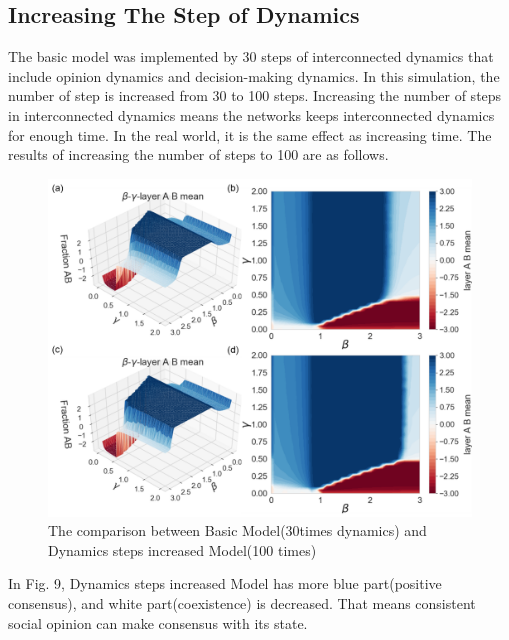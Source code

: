 \documentclass[english]{cccconf}
\begin{document}
\subsection{Increasing The Step of Dynamics}
The basic model was implemented by 30 steps of interconnected dynamics that include opinion dynamics and decision-making dynamics. In this simulation, the number of step is increased from 30 to 100 steps. Increasing the number of steps in interconnected dynamics means the networks keeps interconnected dynamics for enough time.  In the real world, it is the same effect as increasing time.
The results of increasing the number of steps to 100 are as follows.
\begin{figure}[!htb]
  \centering
  \includegraphics[width=\hsize]{FIG9.png}
  \caption{The comparison between Basic Model(30times dynamics) and Dynamics steps increased Model(100 times)}
  \label{Fig9}
\end{figure}

In Fig. 9, Dynamics steps increased Model has more blue part(positive consensus), and white part(coexistence) is decreased. That means consistent social opinion can make consensus with its state.
\end{document}
